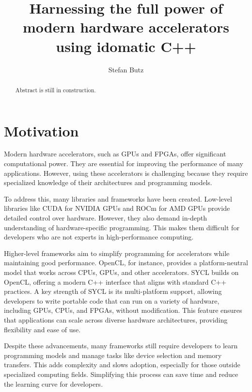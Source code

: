 \documentclass[manuscript,nonacm]{acmart}
\title{Harnessing the full power of modern hardware accelerators using idomatic C++}
\author{Stefan Butz}
\affiliation{%
    \institution{University of Hagen}
    \city{Hagen}
    \country{Germany}
}
\begin{document}
\begin{abstract}
Abstract is still in construction.
\end{abstract}


\maketitle

\section{Motivation}


Modern hardware accelerators, such as GPUs and FPGAs, offer significant computational power.
They are essential for improving the performance of many applications.
However, using these accelerators is challenging because they require specialized knowledge of
their architectures and programming models.

To address this, many libraries and frameworks have been created.
Low-level libraries like CUDA for NVIDIA GPUs and ROCm for AMD GPUs provide detailed control over hardware.
However, they also demand in-depth understanding of hardware-specific programming.
This makes them difficult for developers who are not experts in high-performance computing.

Higher-level frameworks aim to simplify programming for accelerators while maintaining good performance.
OpenCL, for instance, provides a platform-neutral model that works across CPUs, GPUs, and other accelerators.
SYCL builds on OpenCL, offering a modern C++ interface that aligns with standard C++ practices.
A key strength of SYCL is its multi-platform support, allowing developers to write portable code that can
run on a variety of hardware, including GPUs, CPUs, and FPGAs, without modification.
This feature ensures that applications can scale across diverse hardware architectures, providing flexibility
and ease of use.

Despite these advancements, many frameworks still require developers to learn programming models and manage
tasks like device selection and memory transfers.
This adds complexity and slows adoption, especially for those outside specialized computing fields.
Simplifying this process can save time and reduce the learning curve for developers.
\end{document}
